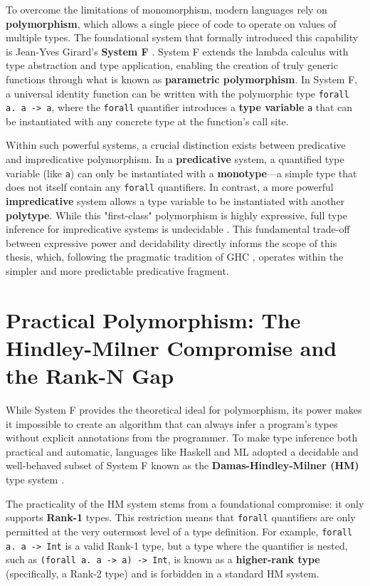 To overcome the limitations of monomorphism, modern languages rely on \textbf{polymorphism}, which allows a single piece of code to operate on values of multiple types. The foundational system that formally introduced this capability is Jean-Yves Girard's \textbf{System F} \cite{girard-system-f}. System F extends the lambda calculus with type abstraction and type application, enabling the creation of truly generic functions through what is known as \textbf{parametric polymorphism}. In System F, a universal identity function can be written with the polymorphic type \texttt{forall a. a -> a}, where the \texttt{forall} quantifier introduces a \textbf{type variable} \texttt{a} that can be instantiated with any concrete type at the function's call site.

Within such powerful systems, a crucial distinction exists between predicative and impredicative polymorphism. In a \textbf{predicative} system, a quantified type variable (like \texttt{a}) can only be instantiated with a \textbf{monotype}---a simple type that does not itself contain any \texttt{forall} quantifiers. In contrast, a more powerful \textbf{impredicative} system allows a type variable to be instantiated with another \textbf{polytype}. While this "first-class" polymorphism is highly expressive, full type inference for impredicative systems is undecidable \cite{wells-typability-1999, serrano-quick-2020}. This fundamental trade-off between expressive power and decidability directly informs the scope of this thesis, which, following the pragmatic tradition of GHC \cite{jones-practical-2007}, operates within the simpler and more predictable predicative fragment.

\section{Practical Polymorphism: The Hindley-Milner Compromise and the Rank-N Gap}
\label{sec:LitReviewHM}

While System F provides the theoretical ideal for polymorphism, its power makes it impossible to create an algorithm that can always infer a program's types without explicit annotations from the programmer. To make type inference both practical and automatic, languages like Haskell and ML adopted a decidable and well-behaved subset of System F known as the \textbf{Damas-Hindley-Milner (HM)} type system \cite{damas-milner}.

The practicality of the HM system stems from a foundational compromise: it only supports \textbf{Rank-1} types. This restriction means that \texttt{forall} quantifiers are only permitted at the very outermost level of a type definition. For example, \texttt{forall a. a -> Int} is a valid Rank-1 type, but a type where the quantifier is nested, such as \texttt{(forall a. a -> a) -> Int}, is known as a \textbf{higher-rank type} (specifically, a Rank-2 type) and is forbidden in a standard HM system.

